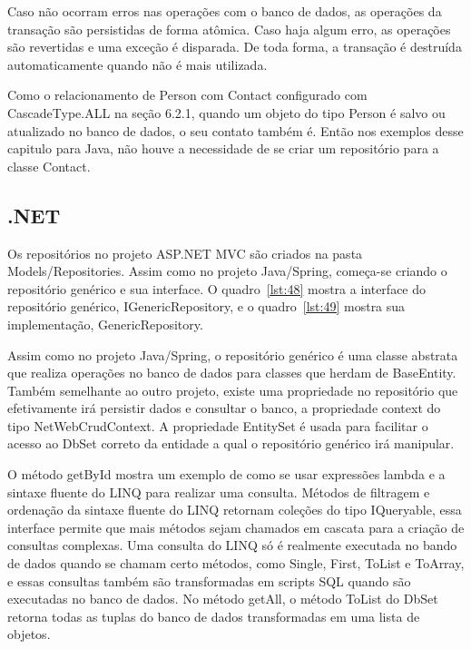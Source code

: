 \documentclass[a4paper,12pt]{article}
\newcommand{\sharpcode}[3] {
	
	\FloatBarrier
}
\begin{document}
Caso não ocorram erros nas operações com o banco de dados, as operações da transação são persistidas de forma atômica. Caso haja algum erro, as operações são revertidas e uma exceção é disparada. De toda forma, a transação é destruída automaticamente quando não é mais utilizada.

Como o relacionamento de Person com Contact configurado com CascadeType.ALL na seção 6.2.1, quando um objeto do tipo Person é salvo ou atualizado no banco de dados, o seu contato também é. Então nos exemplos desse capitulo para Java, não houve a necessidade de se criar um repositório para a classe Contact.

\subsection{.NET}

Os repositórios no projeto ASP.NET MVC são criados na pasta Models/Repositories. Assim como no projeto Java/Spring, começa-se criando o repositório genérico e sua interface. O quadro~\ref{lst:48} mostra a interface do repositório genérico, IGenericRepository, e o quadro~\ref{lst:49} mostra sua implementação, GenericRepository.

\sharpcode{code/48.txt}{Interface IGenericRepository}{lst:48}

\sharpcode{code/49.txt}{Classe GenericRepository}{lst:49}

Assim como no projeto Java/Spring, o repositório genérico é uma classe abstrata que realiza operações no banco de dados para classes que herdam de BaseEntity. Também semelhante ao outro projeto, existe uma propriedade no repositório que efetivamente irá persistir dados e consultar o banco, a propriedade context do tipo NetWebCrudContext. A propriedade EntitySet é usada para facilitar o acesso ao DbSet correto da entidade a qual o repositório genérico irá manipular.

O método getById mostra um exemplo de como se usar expressões lambda e a sintaxe fluente do LINQ para realizar uma consulta. Métodos de filtragem e ordenação da sintaxe fluente do LINQ retornam coleções do tipo IQueryable, essa interface permite que mais métodos sejam chamados em cascata para a criação de consultas complexas. Uma consulta do LINQ só é realmente executada no bando de dados quando se chamam certo métodos, como Single, First, ToList e ToArray, e essas consultas também são transformadas em scripts SQL quando são executadas no banco de dados. No método getAll, o método ToList do DbSet retorna todas as tuplas do banco de dados transformadas em uma lista de objetos.
\end{document}
